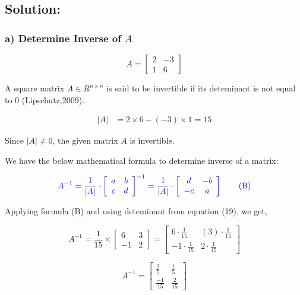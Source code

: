 \documentclass[a4paper]{report}
\begin{document}
\subsection*{Solution:}

\subsubsection*{a) Determine Inverse of $A$}

\[A=\begin{bmatrix}
    2&-3\\1&6
\end{bmatrix}\]

\vspace{3mm}
A square matrix $A \in R^{n\times n}$ is said to be invertible if its deteminant is not equal to 0 (Lipschutz,2009).

\begin{align}
    |A| &= 2 \times 6 - (-3) \times 1 = 15
\end{align}


Since $|A| \neq 0$, the given matrix $A$ is invertible.


We have the below mathematical formula to determine inverse of a matrix:

\begin{equation}
    \color{blue} A^{-1}=\frac{1}{|A|}\cdot \left [\begin{array}{cc}
    a&b\\c&d
\end{array}\right]^{-1} = \frac{1}{|A|}\cdot \left [\begin{array}{cc}
    d&-b\\-c&a
\end{array}\right] \tag{B}
\end{equation}

Applying formula (B) and using deteminant from equation (19), we get,

\[ A^{-1}=\frac{1}{15} \times \begin{bmatrix}
    6&3\\-1&2
\end{bmatrix} =\begin{bmatrix}
    6\cdot \frac{1}{15}&(3)\cdot \frac{1}{15}\\-1\cdot \frac{1}{15}&2 \cdot \frac{1}{15}
\end{bmatrix} \]


\[  \boxed{A^{-1}= \begin{bmatrix}
    \frac{2}{5}&\frac{1}{5}\\ \frac{-1}{15}&\frac{2}{15}
\end{bmatrix}}\]
\end{document}
